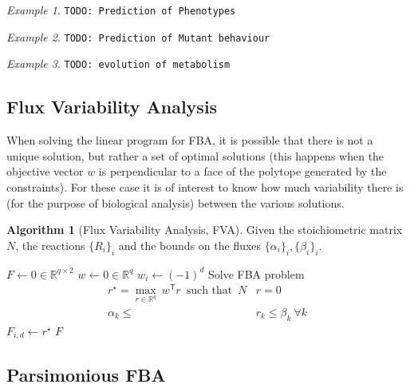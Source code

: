 \documentclass[a4paper]{article}
\newcommand{\todo}[1]{\texttt{TODO: #1}}
\newcommand{\T}{\mathsf{T}}
\DeclareMathOperator{\st}{such~that}
\theoremstyle{plain}
\theoremstyle{definition}
\newtheorem{alg}{Algorithm}[section]
\theoremstyle{remark}
\newtheorem*{example}{Example}
\begin{document}
\begin{example}
  \todo{Prediction of Phenotypes}
\end{example}

\begin{example}
  \todo{Prediction of Mutant behaviour}
\end{example}

\begin{example}
  \todo{evolution of metabolism}
\end{example}

\subsection{Flux Variability Analysis}

When solving the linear program for FBA, it is possible that there is not a
unique solution, but rather a set of optimal solutions (this happens when the
objective vector $w$ is perpendicular to a face of the polytope generated by
the constraints). For these case it is of interest to know how much
variability there is (for the purpose of biological analysis) between the
various solutions.

\begin{alg}[Flux Variability Analysis, FVA]
  Given the stoichiometric matrix $N$, the reactions $\{R_i\}_i$ and the
  bounds on the fluxes $\{\alpha_i\}_i, \{\beta_i\}_i$.
  \begin{algorithmic}
      \State $F \gets 0 \in \mathbb{R}^{q \times 2}$
          \State $w \gets 0 \in \mathbb{R}^{q}$
          \State $w_i \gets (-1)^d$
          \State Solve FBA problem
            \begin{align*}
              r^\star = \max_{r \in \mathbb{R}^q} ~ w^\T r ~ \st ~ N&r = 0 \\
                \alpha_k \leq &r_k \leq \beta_k ~ \forall k
            \end{align*}
          \State $F_{i, d} \gets r^\star$
        \EndFor
      \EndFor
      \State \Return $F$
    \EndFunction
  \end{algorithmic}
\end{alg}

\subsection{Parsimonious FBA}
\end{document}
